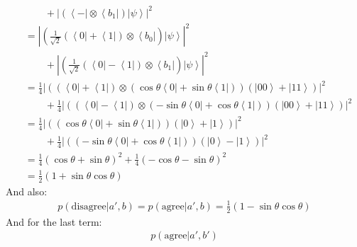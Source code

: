 \documentclass[12pt,a4]{article}
\begin{document}
\begin{enumerate}
\begin{enumerate}
\begin{align*}
                                 &\qquad + |(\left\langle - \right| \otimes \left\langle b_1 \right|)\left|\psi\right\rangle|^2\\
                                 &= |(\frac{1}{\sqrt{2}}(\left\langle 0 \right| + \left\langle 1 \right|)\otimes \left\langle b_0 \right|)\left|\psi\right\rangle|^2\\
                                 &\qquad + |(\frac{1}{\sqrt{2}}(\left\langle 0 \right| - \left\langle 1 \right|)\otimes \left\langle b_1 \right|)\left|\psi\right\rangle|^2\\
                                 &= \frac{1}{4}|( (\left\langle 0 \right| + \left\langle 1 \right|)\otimes (\cos \theta \left\langle 0\right| + \sin \theta \left\langle1\right|))\left(\left| 00 \right \rangle + \left|11\right \rangle\right)|^2\\
                                 &\qquad + \frac{1}{4} |((\left\langle 0 \right| - \left\langle 1 \right|) \otimes (-\sin\theta \left\langle 0\right| + \cos\theta \left\langle1\right|))\left(\left| 00 \right \rangle + \left|11\right \rangle\right)|^2\\
                                 &= \frac{1}{4}|( (\cos \theta \left\langle 0\right| + \sin \theta \left\langle1\right|))\left(\left| 0 \right \rangle + \left|1\right \rangle\right)|^2\\
                                 &\qquad + \frac{1}{4} |((-\sin\theta \left\langle 0\right| + \cos\theta \left\langle1\right|))\left(\left| 0 \right \rangle - \left|1\right \rangle\right)|^2\\
                                 &= \frac{1}{4}(\cos \theta + \sin \theta )^2 + \frac{1}{4}(- \cos \theta - \sin \theta)^2\\
                                 &= \frac{1}{2}(1 + \sin \theta \cos \theta)
        \end{align*}
        And also:
        \begin{align*}
          p(\text{disagree} | a', b) = p(\text{agree} | a', b)
                                 = \frac{1}{2}(1 - \sin \theta \cos \theta)
        \end{align*}
        And for the last term:
        \begin{align*}
          p(\text{agree} | a', b') 

\end{align*}
\end{enumerate}
\end{enumerate}
\end{document}
